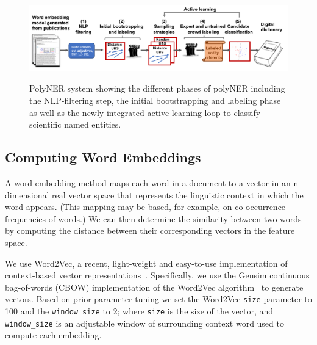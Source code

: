 \begin{figure}[!t]
{\includegraphics[width=\textwidth]{figures/architecture.pdf}}
\caption{\label{fig:architecture} PolyNER system showing the different phases of polyNER including the NLP-filtering step, the initial bootstrapping and labeling phase as well as the newly integrated active learning loop to classify scientific named entities. 
}
\end{figure}

\subsection{Computing Word Embeddings}\label{sec:wordembeddings}
A word embedding method maps each word
in a document to a vector in an n-dimensional real vector space that
represents the linguistic context in which the word appears. (This mapping may
be based, for example, on co-occurrence frequencies of words.) 
We can then determine the similarity between two words by computing the distance between
their corresponding vectors in the feature space.

We use Word2Vec, a recent, light-weight and easy-to-use implementation of context-based vector representations~\cite{mikolov2013efficient,mikolov2013distributed}.
Specifically, we use the Gensim continuous bag-of-words
(CBOW) implementation of the Word2Vec
algorithm~\cite{rehurek2010software} to generate vectors.
Based on prior parameter tuning we set the 
Word2Vec \texttt{size} parameter to 100 and the \texttt{window_size} to 2; 
where \texttt{size}  is the size of the vector, and \texttt{window_size}
is an adjustable window of surrounding context word used to compute each embedding.

